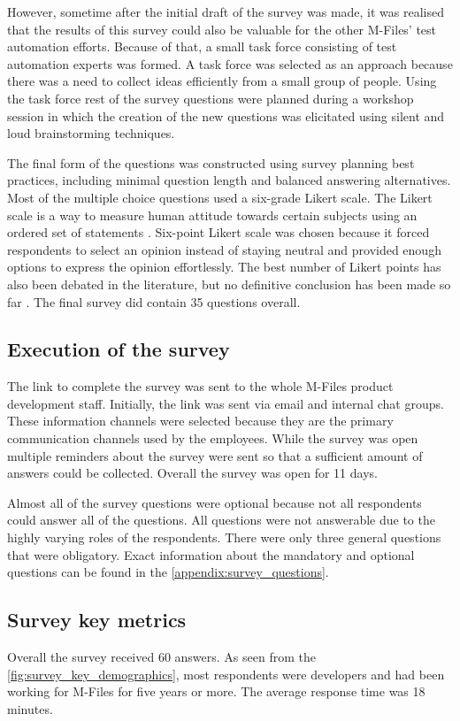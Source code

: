 However, sometime after the initial draft of the survey was made, it was realised that the results of this survey could also be valuable for the other M-Files' test automation efforts. Because of that, a small task force consisting of test automation experts was formed. A task force was selected as an approach because there was a need to collect ideas efficiently from a small group of people. Using the task force rest of the survey questions were planned during a workshop session in which the creation of the new questions was elicitated using silent and loud brainstorming techniques.

The final form of the questions was constructed using survey planning best practices, including minimal question length and balanced answering alternatives. Most of the multiple choice questions used a six-grade Likert scale. The Likert scale is a way to measure human attitude towards certain subjects using an ordered set of statements \cite{joshi2015likert}. Six-point Likert scale was chosen because it forced respondents to select an opinion instead of staying neutral and provided enough options to express the opinion effortlessly. The best number of Likert points has also been debated in the literature, but no definitive conclusion has been made so far \cite{edwards2014effects,garland1991mid}. The final survey did contain 35 questions overall.

\subsection{Execution of the survey}\label{subsection:execution_of_the_survey}
The link to complete the survey was sent to the whole M-Files product development staff. Initially, the link was sent via email and internal chat groups. These information channels were selected because they are the primary communication channels used by the employees. While the survey was open multiple reminders about the survey were sent so that a sufficient amount of answers could be collected. Overall the survey was open for 11 days.

Almost all of the survey questions were optional because not all respondents could answer all of the questions. All questions were not answerable due to the highly varying roles of the respondents. There were only three general questions that were obligatory. Exact information about the mandatory and optional questions can be found in the \autoref{appendix:survey_questions}.

\subsection{Survey key metrics}
Overall the survey received 60 answers. As seen from the \autoref{fig:survey_key_demographics}, most respondents were developers and had been working for M-Files for five years or more. The average response time was 18 minutes.

